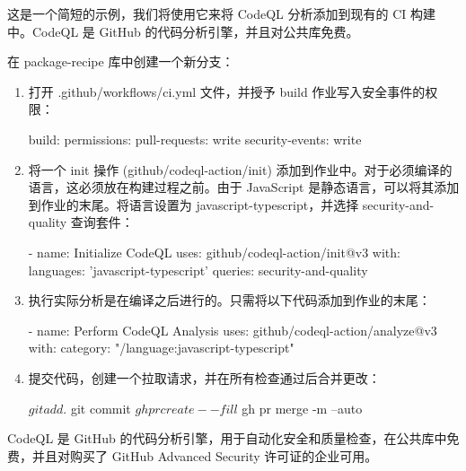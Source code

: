 这是一个简短的示例，我们将使用它来将 CodeQL 分析添加到现有的 CI 构建中。CodeQL 是 GitHub 的代码分析引擎，并且对公共库免费。


在 package-recipe 库中创建一个新分支：



\begin{enumerate}
\item 
打开 .github/workflows/ci.yml 文件，并授予 build 作业写入安全事件的权限：

\begin{shell}
build:
  permissions:
    pull-requests: write
    security-events: write
\end{shell}

\item 
将一个 init 操作 (github/codeql-action/init) 添加到作业中。对于必须编译的语言，这必须放在构建过程之前。由于 JavaScript 是静态语言，可以将其添加到作业的末尾。将语言设置为 javascript-typescript，并选择 security-and-quality 查询套件：

\begin{shell}
    - name: Initialize CodeQL
      uses: github/codeql-action/init@v3
      with:
        languages: 'javascript-typescript'
        queries: security-and-quality
\end{shell}

\item 
执行实际分析是在编译之后进行的。只需将以下代码添加到作业的末尾：

\begin{shell}
    - name: Perform CodeQL Analysis
      uses: github/codeql-action/analyze@v3
      with:
        category: "/language:javascript-typescript"
\end{shell}

\item 
提交代码，创建一个拉取请求，并在所有检查通过后合并更改：

\begin{shell}
$ git add .
$ git commit
$ gh pr create --fill
$ gh pr merge -m --auto
\end{shell}
\end{enumerate}


CodeQL 是 GitHub 的代码分析引擎，用于自动化安全和质量检查，在公共库中免费，并且对购买了 GitHub Advanced Security 许可证的企业可用。

